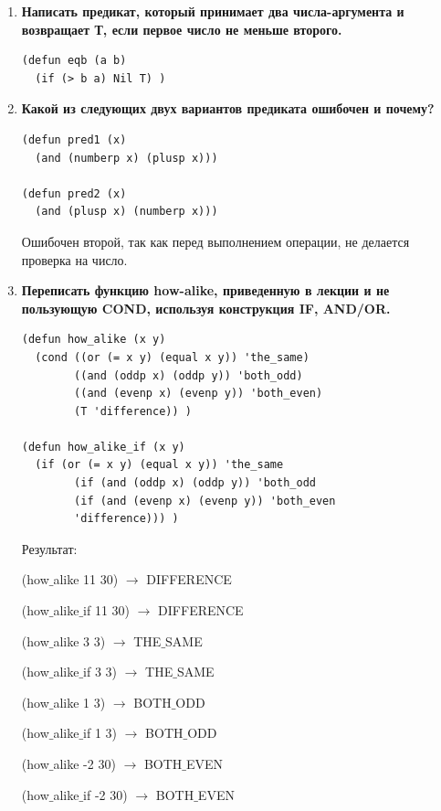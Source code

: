 \documentclass[a4paper,14pt]{extreport} %
\begin{document}
\begin{enumerate}
\item \textbf{Написать предикат, который принимает два числа-аргумента и возвращает Т, если первое число не меньше второго.}

\begin{lstlisting}
(defun eqb (a b)
  (if (> b a) Nil T) )
\end{lstlisting}

\item \textbf{Какой из следующих двух вариантов предиката ошибочен и почему?}

\begin{lstlisting}
(defun pred1 (x)
  (and (numberp x) (plusp x)))

(defun pred2 (x)
  (and (plusp x) (numberp x)))
\end{lstlisting}

Ошибочен второй, так как перед выполнением операции, не делается проверка на число. 

\item \textbf{Переписать функцию how-alike, приведенную в лекции и не пользующую COND, используя конструкция IF, AND/OR.}

\begin{lstlisting}
(defun how_alike (x y)
  (cond ((or (= x y) (equal x y)) 'the_same)
        ((and (oddp x) (oddp y)) 'both_odd)
        ((and (evenp x) (evenp y)) 'both_even)
        (T 'difference)) )

(defun how_alike_if (x y)
  (if (or (= x y) (equal x y)) 'the_same
        (if (and (oddp x) (oddp y)) 'both_odd
        (if (and (evenp x) (evenp y)) 'both_even 
        'difference))) )
\end{lstlisting}

Результат:

(how$\_$alike 11 30) $\to$ DIFFERENCE

(how$\_$alike$\_$if 11 30) $\to$ DIFFERENCE

(how$\_$alike 3 3) $\to$ THE$\_$SAME

(how$\_$alike$\_$if 3 3) $\to$ THE$\_$SAME

(how$\_$alike 1 3) $\to$ BOTH$\_$ODD

(how$\_$alike$\_$if 1 3) $\to$ BOTH$\_$ODD

(how$\_$alike -2 30) $\to$ BOTH$\_$EVEN

(how$\_$alike$\_$if -2 30) $\to$ BOTH$\_$EVEN

\end{enumerate}
\end{document}
